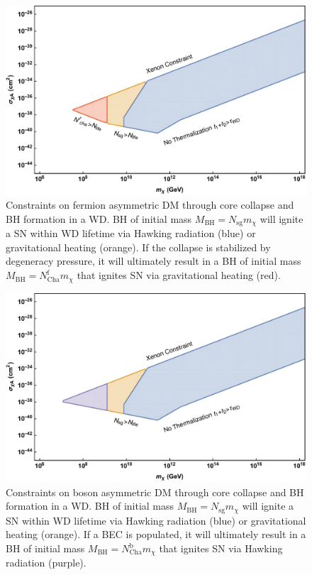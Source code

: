 \documentclass[preprintnumbers,amsmath,amssymb,prd,superscriptaddress]{revtex4}
\begin{document}
\begin{figure}
\centering
\includegraphics[scale=0.5]{BHfermion}
\caption{Constraints on fermion asymmetric DM through core collapse and BH formation in a WD.
BH of initial mass $M_\text{BH} = N_\text{sg} m_\chi$ will ignite a SN within WD lifetime via Hawking radiation (blue) or gravitational heating (orange).
If the collapse is stabilized by degeneracy pressure, it will ultimately result in a BH of initial mass $M_\text{BH} = N^\text{f}_\text{Cha} m_\chi$ that ignites SN via gravitational heating (red).
}
\label{fig:BHfermion}
\end{figure}

\begin{figure}
\centering
\includegraphics[scale=0.5]{BHboson}
\caption{Constraints on boson asymmetric DM through core collapse and BH formation in a WD.
BH of initial mass $M_\text{BH} = N_\text{sg} m_\chi$ will ignite a SN within WD lifetime via Hawking radiation (blue) or gravitational heating (orange).
If a BEC is populated, it will ultimately result in a BH of initial mass $M_\text{BH} = N^\text{b}_\text{Cha} m_\chi$ that ignites SN via Hawking radiation (purple).}
\label{fig:BHboson}
\end{figure}
\end{document}
